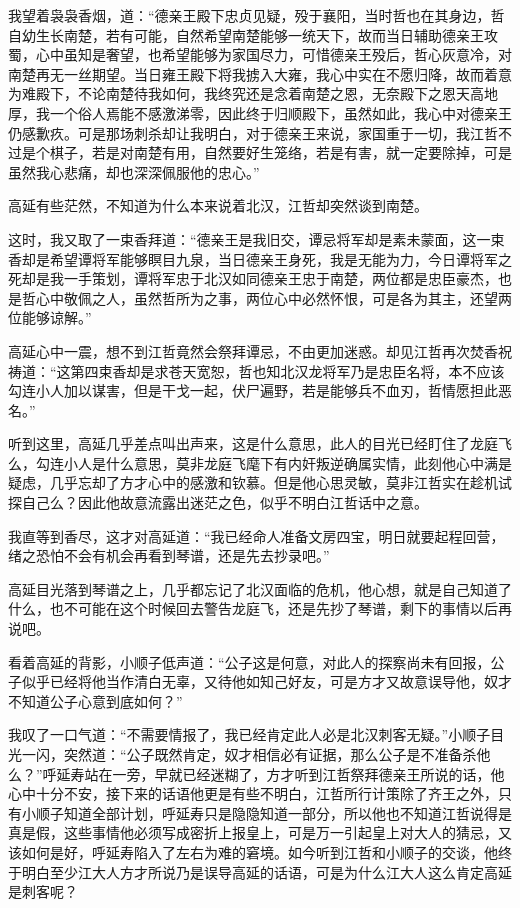 我望着袅袅香烟，道：“德亲王殿下忠贞见疑，殁于襄阳，当时哲也在其身边，哲自幼生长南楚，若有可能，自然希望南楚能够一统天下，故而当日辅助德亲王攻蜀，心中虽知是奢望，也希望能够为家国尽力，可惜德亲王殁后，哲心灰意冷，对南楚再无一丝期望。当日雍王殿下将我掳入大雍，我心中实在不愿归降，故而着意为难殿下，不论南楚待我如何，我终究还是念着南楚之恩，无奈殿下之恩天高地厚，我一个俗人焉能不感激涕零，因此终于归顺殿下，虽然如此，我心中对德亲王仍感歉疚。可是那场刺杀却让我明白，对于德亲王来说，家国重于一切，我江哲不过是个棋子，若是对南楚有用，自然要好生笼络，若是有害，就一定要除掉，可是虽然我心悲痛，却也深深佩服他的忠心。”

高延有些茫然，不知道为什么本来说着北汉，江哲却突然谈到南楚。

这时，我又取了一束香拜道：“德亲王是我旧交，谭忌将军却是素未蒙面，这一束香却是希望谭将军能够瞑目九泉，当日德亲王身死，我是无能为力，今日谭将军之死却是我一手策划，谭将军忠于北汉如同德亲王忠于南楚，两位都是忠臣豪杰，也是哲心中敬佩之人，虽然哲所为之事，两位心中必然怀恨，可是各为其主，还望两位能够谅解。”

高延心中一震，想不到江哲竟然会祭拜谭忌，不由更加迷惑。却见江哲再次焚香祝祷道：“这第四束香却是求苍天宽恕，哲也知北汉龙将军乃是忠臣名将，本不应该勾连小人加以谋害，但是干戈一起，伏尸遍野，若是能够兵不血刃，哲情愿担此恶名。”

听到这里，高延几乎差点叫出声来，这是什么意思，此人的目光已经盯住了龙庭飞么，勾连小人是什么意思，莫非龙庭飞麾下有内奸叛逆确属实情，此刻他心中满是疑虑，几乎忘却了方才心中的感激和钦慕。但是他心思灵敏，莫非江哲实在趁机试探自己么？因此他故意流露出迷茫之色，似乎不明白江哲话中之意。

我直等到香尽，这才对高延道：“我已经命人准备文房四宝，明日就要起程回营，绪之恐怕不会有机会再看到琴谱，还是先去抄录吧。”

高延目光落到琴谱之上，几乎都忘记了北汉面临的危机，他心想，就是自己知道了什么，也不可能在这个时候回去警告龙庭飞，还是先抄了琴谱，剩下的事情以后再说吧。

看着高延的背影，小顺子低声道：“公子这是何意，对此人的探察尚未有回报，公子似乎已经将他当作清白无辜，又待他如知己好友，可是方才又故意误导他，奴才不知道公子心意到底如何？”

我叹了一口气道：“不需要情报了，我已经肯定此人必是北汉刺客无疑。”小顺子目光一闪，突然道：“公子既然肯定，奴才相信必有证据，那么公子是不准备杀他么？”呼延寿站在一旁，早就已经迷糊了，方才听到江哲祭拜德亲王所说的话，他心中十分不安，接下来的话语他更是有些不明白，江哲所行计策除了齐王之外，只有小顺子知道全部计划，呼延寿只是隐隐知道一部分，所以他也不知道江哲说得是真是假，这些事情他必须写成密折上报皇上，可是万一引起皇上对大人的猜忌，又该如何是好，呼延寿陷入了左右为难的窘境。如今听到江哲和小顺子的交谈，他终于明白至少江大人方才所说乃是误导高延的话语，可是为什么江大人这么肯定高延是刺客呢？

